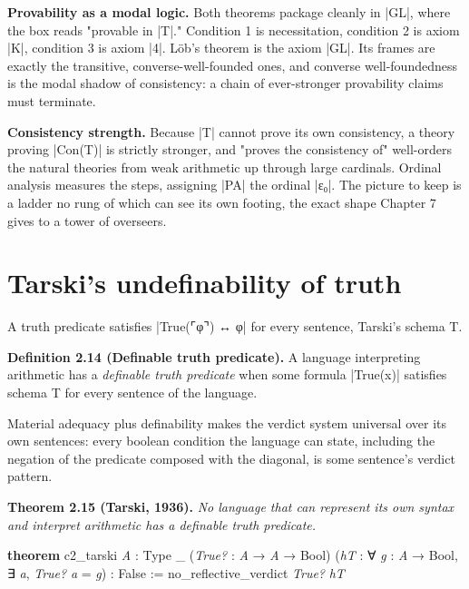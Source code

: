 \documentclass{memoir}
\begin{document}
\textbf{Provability as a modal logic.} Both theorems package cleanly in \LeanVerb|GL|, where the
box reads "provable in \LeanVerb|T|." Condition 1 is necessitation, condition 2 is axiom
\LeanVerb|K|, condition 3 is axiom \LeanVerb|4|. Löb's theorem is the axiom \LeanVerb|GL|. Its frames are
exactly the transitive, converse-well-founded ones, and converse
well-foundedness is the modal shadow of consistency: a chain of ever-stronger
provability claims must terminate.

\textbf{Consistency strength.} Because \LeanVerb|T| cannot prove its own consistency, a theory
proving \LeanVerb|Con(T)| is strictly stronger, and "proves the consistency of"
well-orders the natural theories from weak arithmetic up through large
cardinals. Ordinal analysis measures the steps, assigning \LeanVerb|PA| the ordinal \LeanVerb|ε₀|.
The picture to keep is a ladder no rung of which can see its own footing, the
exact shape Chapter 7 gives to a tower of overseers.



\section{Tarski's undefinability of truth}\label{Two--Schemas--of--Impossibility-005F-005F-005F--Machine--Checked--Limits--of--Trustworthy--Machine--Learning-005F-005F-005F--and--Why--They--Tighten--with--Capability----The--Classical--Limits----Tarski-005F-005F-005Fs--undefinability--of--truth}

A truth predicate satisfies \LeanVerb|True(⌜φ⌝) ↔ φ| for every sentence, Tarski's schema
T.

\textbf{Definition 2.14 (Definable truth predicate).} A language interpreting arithmetic
has a \emph{definable truth predicate} when some formula \LeanVerb|True(x)| satisfies schema T
for every sentence of the language.

Material adequacy plus definability makes the verdict system universal over its
own sentences: every boolean condition the language can state, including the
negation of the predicate composed with the diagonal, is some sentence's verdict
pattern.

\textbf{Theorem 2.15 (Tarski, 1936).} \emph{No language that can represent its own syntax and
interpret arithmetic has a definable truth predicate.}

\begin{LeanVerbatim}
\textbf{theorem} c2_tarski \textit{A} : Type _ (\textit{True?} : \textit{A} → \textit{A} → Bool)
    (\textit{hT} : ∀ \textit{g} : \textit{A} → Bool, ∃ \textit{a}, \textit{True?} \textit{a} = \textit{g}) : False :=
  no_reflective_verdict \textit{True?} \textit{hT}

\end{LeanVerbatim}
\end{document}
